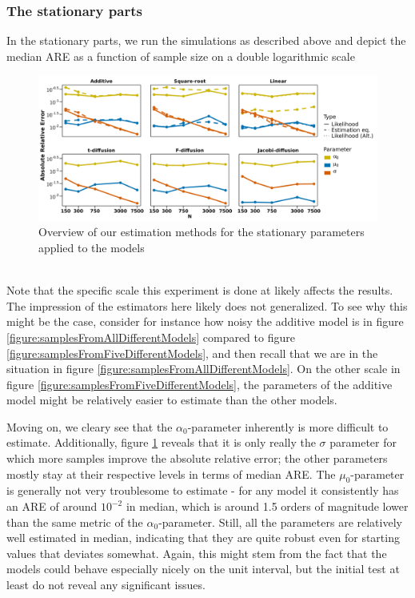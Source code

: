 \subsubsection{The stationary parts}
In the stationary parts, we run the simulations as described above and depict the median ARE as a function of sample size on a double logarithmic scale
\begin{figure}[h]
    \begin{center}
    \includegraphics[scale = .1]{figures/parameter_precision_stationary.jpeg}
    \caption{Overview of our estimation methods for the stationary parameters applied to the models}
    \label{figure:overviewOfEstimatorsStationary}
    \end{center}
\end{figure}\\
Note that the specific scale this experiment is done at likely affects the results. The impression of the estimators here likely does not generalized. To see why this might be the case, consider for instance how noisy the additive model is in figure \ref{figure:samplesFromAllDifferentModels} compared to figure \ref{figure:samplesFromFiveDifferentModels}, and then recall that we are in the situation in figure \ref{figure:samplesFromAllDifferentModels}. On the other scale in figure \ref{figure:samplesFromFiveDifferentModels}, the parameters of the additive model might be relatively easier to estimate than the other models.
 
Moving on, we cleary see that the $\alpha_0$-parameter inherently is more difficult to estimate. Additionally, figure \ref{figure:overviewOfEstimatorsStationary} reveals that it is only really the $\sigma$ parameter for which more samples improve the absolute relative error; the other parameters mostly stay at their respective levels in terms of median ARE. The $\mu_0$-parameter is generally not very troublesome to estimate - for any model it consistently has an ARE of around $10^{-2}$ in median, which is around 1.5 orders of magnitude lower than the same metric of the $\alpha_0$-parameter. Still, all the parameters are relatively well estimated in median, indicating that they are quite robust even for starting values that deviates somewhat. Again, this might stem from the fact that the models could behave especially nicely on the unit interval, but the initial test at least do not reveal any significant issues.

